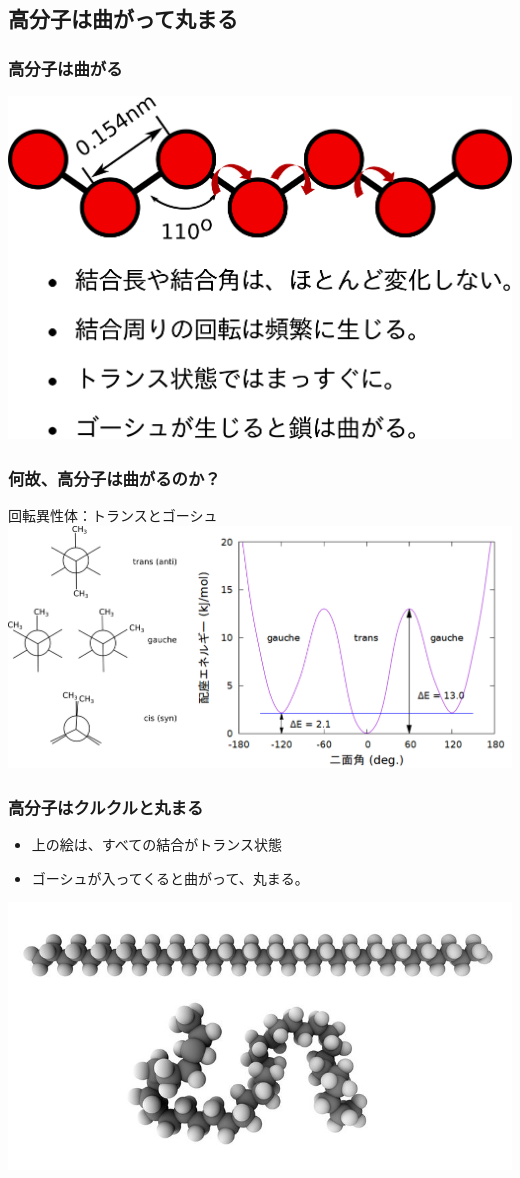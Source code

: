\documentclass[unicode,12pt]{beamer}%
\begin{document}
\subsection{高分子は曲がって丸まる}
\begin{frame}
	\frametitle{高分子は曲がる}
	\centering
	\includegraphics[width=.8\textwidth]{polymer_model_2.png}
\end{frame}

\begin{frame}
	\frametitle{何故、高分子は曲がるのか？}
	回転異性体：トランスとゴーシュ
	\vspace{5mm}
	\centering
	\includegraphics[width=\textwidth]{butane.png}
\end{frame}

\begin{frame}
	\frametitle{高分子はクルクルと丸まる}
	\begin{itemize}
		\item 上の絵は、すべての結合がトランス状態
		\item ゴーシュが入ってくると曲がって、丸まる。
	\end{itemize}
	\centering
	\includegraphics[width=\textwidth]{PE.jpg}
\end{frame}
\end{document}
